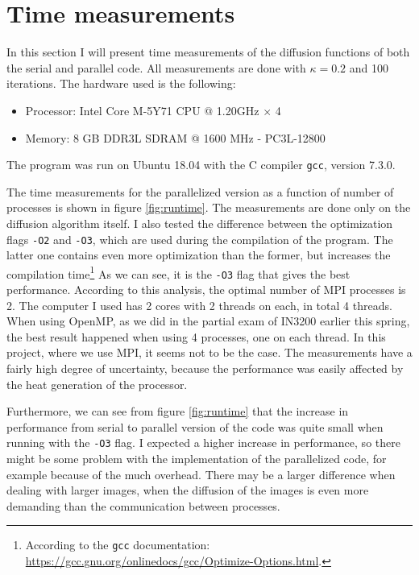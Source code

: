 \documentclass[10pt, a4paper]{amsart}
\numberwithin{figure}{section}
\numberwithin{table}{section}
\begin{document}
\section{Time measurements}
In this section I will present time measurements of the diffusion functions of both the serial and parallel code. All measurements are done with $\kappa=0.2$ and 100 iterations. The hardware used is the following:
\begin{itemize}
  \item Processor: Intel Core M-5Y71 CPU @ 1.20GHz $\times$ 4
  \item Memory: 8 GB DDR3L SDRAM @ 1600 MHz - PC3L-12800
\end{itemize}
The program was run on Ubuntu 18.04 with the C compiler \texttt{gcc}, version 7.3.0.

The time measurements for the parallelized version as a function of number of processes is shown in figure \ref{fig:runtime}. The measurements are done only on the diffusion algorithm itself. I also tested the difference between the optimization flags \texttt{-O2} and \texttt{-O3}, which are used during the compilation of the program.  The latter one contains even more optimization than the former, but increases the compilation time\footnote{According to the \texttt{gcc} documentation: \url{https://gcc.gnu.org/onlinedocs/gcc/Optimize-Options.html}.} As we can see, it is the \texttt{-O3} flag that gives the best performance. According to this analysis, the optimal number of MPI processes is 2. The computer I used has 2 cores with 2 threads on each, in total 4 threads. When using OpenMP, as we did in the partial exam of IN3200 earlier this spring, the best result happened when using 4 processes, one on each thread. In this project, where we use MPI, it seems not to be the case. The measurements have a fairly high degree of uncertainty, because the performance was easily affected by the heat generation of the processor.

Furthermore, we can see from figure \ref{fig:runtime} that the increase in performance from serial to parallel version of the code was quite small when running with the \texttt{-O3} flag. I expected a higher increase in performance, so there might be some problem with the implementation of the parallelized code, for example because of the much overhead. There may be a larger difference when dealing with larger images, when the diffusion of the images is even more demanding than the communication between processes.
\end{document}
